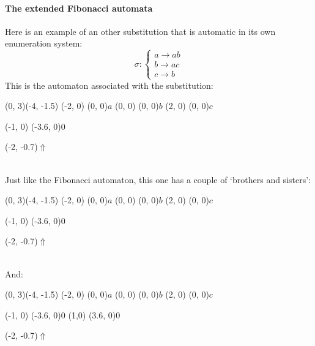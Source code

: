 \documentclass{article}
\begin{document}
\paragraph{The extended Fibonacci automata}
Here is an example of an other substitution that is automatic in its own
enumeration system:
\begin{displaymath}
\sigma: \left\{ \begin{array}{l}
a \rightarrow ab\\
b \rightarrow ac\\
c \rightarrow b
\end{array} \right.
\end{displaymath}
This is the automaton associated with the substitution:\\
\begin{graph}(0, 3)(-4, -1.5)
  (-2, 0) (0, 0){$a$}
  (0, 0)  (0, 0){$b$}
  (2, 0)  (0, 0){$c$}

  (-1, 0) \freetext(-3.6, 0){0}
   
   
   
   

  \freetext(-2, -0.7){$\Uparrow$}
\end{graph}\\
Just like the Fibonacci automaton, this one has a couple of `brothers and 
sisters':\\
\begin{graph}(0, 3)(-4, -1.5)
  (-2, 0) (0, 0){$a$}
  (0, 0)  (0, 0){$b$}
  (2, 0)  (0, 0){$c$}

  (-1, 0) \freetext(-3.6, 0){0}
   
   
   
   

  \freetext(-2, -0.7){$\Uparrow$}
\end{graph}\\
And:\\
\begin{graph}(0, 3)(-4, -1.5)
  (-2, 0) (0, 0){$a$}
  (0, 0)  (0, 0){$b$}
  (2, 0)  (0, 0){$c$}

  (-1, 0) \freetext(-3.6, 0){0}
   
   
   
  (1,0) \freetext(3.6, 0){0}

  \freetext(-2, -0.7){$\Uparrow$}
\end{graph}\\
\end{document}
